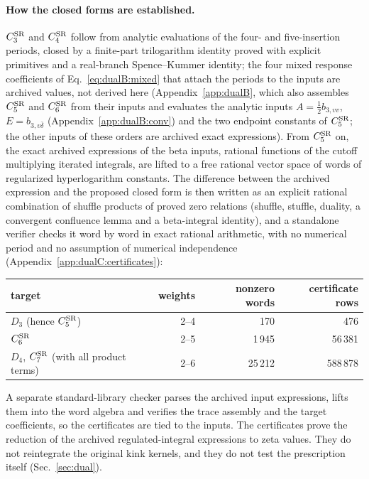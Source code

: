 \documentclass[11pt,a4paper]{article}
\numberwithin{equation}{section}
\newcommand{\CSR}{C^{\rm SR}}
\newcommand{\db}{\bar\delta}
\begin{document}
\paragraph{How the closed forms are established.} $\CSR_3$ and $\CSR_4$ follow from analytic evaluations of the
four- and five-insertion periods, closed by a finite-part trilogarithm identity proved with explicit primitives and a
real-branch Spence--Kummer identity; the four mixed response coefficients of Eq.~\eqref{eq:dualB:mixed} that attach the
periods to the inputs are archived values, not derived here (Appendix~\ref{app:dualB}, which also assembles $\CSR_5$ and $\CSR_6$ from
their inputs and evaluates the analytic inputs $A=\tfrac12b_{3,vv}$, $E=b_{3,v\db}$ (Appendix~\ref{app:dualB:conv}) and the two
endpoint constants of $\CSR_5$; the other inputs of
these orders are archived exact expressions). From $\CSR_5$ on, the exact archived expressions of the beta inputs, rational
functions of the cutoff multiplying iterated integrals, are lifted to a free rational vector space of words of
regularized hyperlogarithm constants. The difference between the archived expression and the proposed closed form is
then written as an explicit rational combination of shuffle products of proved zero relations (shuffle, stuffle,
duality, a convergent confluence lemma and a beta-integral identity), and a standalone verifier checks it word by
word in exact rational arithmetic, with no numerical period and no assumption of numerical independence
(Appendix~\ref{app:dualC:certificates}):
\begin{center}\small
\begin{tabular}{@{}lrrr@{}}
\toprule
target & weights & nonzero words & certificate rows\\
\midrule
$D_3$ (hence $\CSR_5$) & 2--4 & 170 & 476\\
$\CSR_6$ & 2--5 & 1\,945 & 56\,381\\
$D_4$, $\CSR_7$ (with all product terms) & 2--6 & 25\,212 & 588\,878\\
\bottomrule
\end{tabular}
\end{center}
A separate standard-library checker parses the archived input expressions, lifts them into the word algebra and
verifies the trace assembly and the target coefficients, so the certificates are tied to the inputs. The certificates
prove the reduction of the archived regulated-integral expressions to zeta values. They do not reintegrate the
original kink kernels, and they do not test the prescription itself (Sec.~\ref{sec:dual}).
\end{document}
